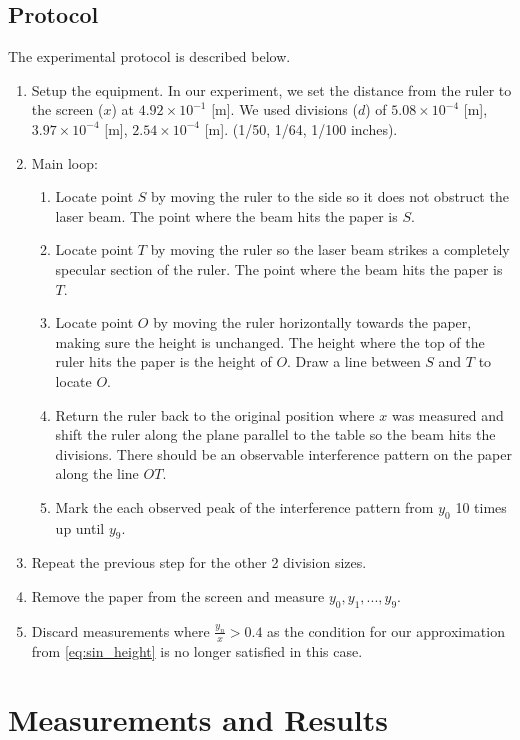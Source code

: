 \documentclass{article}
\begin{document}
\subsection{Protocol}

The experimental protocol is described below.

\begin{enumerate}
  \item Setup the equipment. In our experiment, we set the distance from the ruler to the screen ($x$) at $4.92 \times 10^{-1}$ [m]. We used divisions ($d$) of $5.08 \times 10^{-4}$ [m], $3.97 \times 10^{-4}$ [m], $2.54 \times 10^{-4}$ [m]. (1/50, 1/64, 1/100 inches).
  \item Main loop:
    \begin{enumerate}
      \item Locate point $S$ by moving the ruler to the side so it does not obstruct the laser beam. The point where the beam hits the paper is $S$.
      \item Locate point $T$ by moving the ruler so the laser beam strikes a completely specular section of the ruler. The point where the beam hits the paper is $T$.
      \item Locate point $O$ by moving the ruler horizontally towards the paper, making sure the height is unchanged. The height where the top of the ruler hits the paper is the height of $O$. Draw a line between $S$ and $T$ to locate $O$.
      \item Return the ruler back to the original position where $x$ was measured and shift the ruler along the plane parallel to the table so the beam hits the divisions. There should be an observable interference pattern on the paper along the line $OT$.
      \item Mark the each observed peak of the interference pattern from $y_0$ 10 times up until $y_9$.
    \end{enumerate}
  \item Repeat the previous step for the other 2 division sizes.
  \item Remove the paper from the screen and measure $y_0, y_1, ..., y_9$.
  \item Discard measurements where $\frac{y_n}{x} > 0.4$ as the condition for our approximation from \eqref{eq:sin_height} is no longer satisfied in this case.
\end{enumerate}


\section{Measurements and Results}
\end{document}
